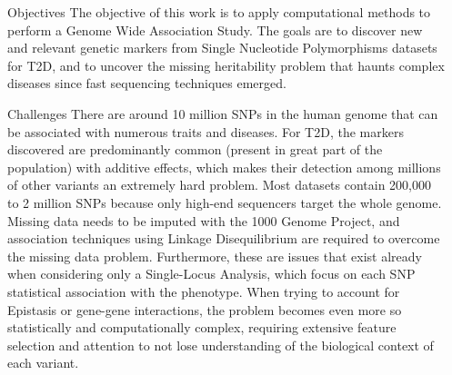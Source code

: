 \documentclass[final]{beamer}
\newlength{\sepwid}
\newlength{\onecolwid}
\begin{document}
\begin{frame}[t]
\begin{columns}[t]
         \begin{column}{\sepwid}  \end{column}

         \begin{column}{\onecolwid} %
         \vspace{-0.5cm}
          \begin{block}{Objectives}
           The objective of this work is to apply computational methods to perform a Genome Wide Association Study. The goals are to discover new and relevant genetic markers from Single Nucleotide Polymorphisms datasets for T2D, and to uncover the missing heritability problem that haunts complex diseases since fast sequencing techniques emerged.      
         \end{block}
         
         \begin{block}{Challenges}
          There are around 10 million SNPs in the human genome that can be associated with numerous traits and diseases. For T2D, the markers discovered are predominantly common (present in great part of the population) with additive effects, which makes their detection among millions of other variants an extremely hard problem. Most datasets contain 200,000 to 2 million SNPs because only high-end sequencers target the whole genome.  
Missing data needs to be imputed with the 1000 Genome Project\cite{10002012integrated}, and association techniques using Linkage Disequilibrium are required to overcome the missing data problem. 
          Furthermore, these are issues that exist already when considering only a Single-Locus Analysis, which focus on each SNP statistical association with the phenotype. When trying to account for Epistasis or gene-gene interactions, the problem becomes even more so statistically and computationally complex, requiring extensive feature selection and attention to not lose understanding of the biological context of each variant. 
          \end{block}
                    

\end{column}
\end{columns}
\end{frame}
\end{document}
